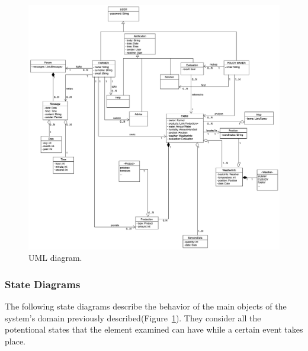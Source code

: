 \begin{figure}[H]
    \begin{center}
    \includegraphics[width=1\textwidth]{images/UML.png}
    \caption{UML diagram.}
    \label{fig:uml}
    \end{center}
\end{figure}
\newpage
\subsubsection{State Diagrams}
The following state diagrams describe the behavior of the main objects of the system's domain previously described(Figure~\ref{fig:uml}). 
They consider all the potentional states that the element examined can have 
while a certain event takes place.

